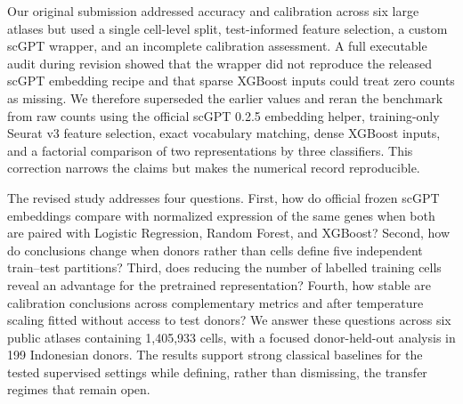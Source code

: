 Our original submission addressed accuracy and calibration across six large atlases but used a single cell-level split, test-informed feature selection, a custom scGPT wrapper, and an incomplete calibration assessment. A full executable audit during revision showed that the wrapper did not reproduce the released scGPT embedding recipe and that sparse XGBoost inputs could treat zero counts as missing. We therefore superseded the earlier values and reran the benchmark from raw counts using the official scGPT 0.2.5 embedding helper, training-only Seurat v3 feature selection, exact vocabulary matching, dense XGBoost inputs, and a factorial comparison of two representations by three classifiers. This correction narrows the claims but makes the numerical record reproducible.

The revised study addresses four questions. First, how do official frozen scGPT embeddings compare with normalized expression of the same genes when both are paired with Logistic Regression, Random Forest, and XGBoost? Second, how do conclusions change when donors rather than cells define five independent train--test partitions? Third, does reducing the number of labelled training cells reveal an advantage for the pretrained representation? Fourth, how stable are calibration conclusions across complementary metrics and after temperature scaling fitted without access to test donors? We answer these questions across six public atlases containing 1,405,933 cells, with a focused donor-held-out analysis in 199 Indonesian donors. The results support strong classical baselines for the tested supervised settings while defining, rather than dismissing, the transfer regimes that remain open.
